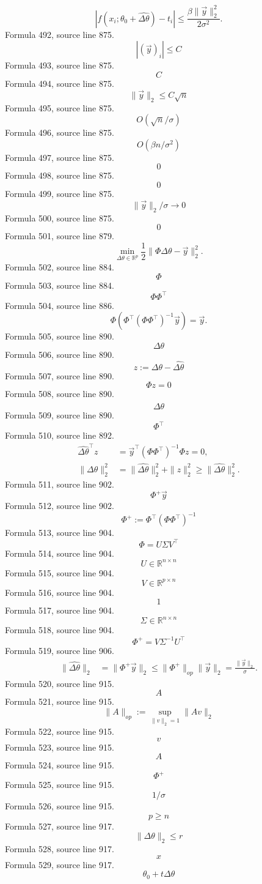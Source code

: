 \documentclass{ctexart}
\begin{document}
\[
\left|f(x_i;\theta_0+\widehat{\Delta\theta})-t_i\right|
\leq\frac{\beta\|\vec y\|_2^2}{2\sigma^2}.
\]
Formula 492, source line 875.
\[|(\vec y)_i|\leq C\]
Formula 493, source line 875.
\[C\]
Formula 494, source line 875.
\[\|\vec y\|_2\leq C\sqrt n\]
Formula 495, source line 875.
\[O(\sqrt n/\sigma)\]
Formula 496, source line 875.
\[O(\beta n/\sigma^2)\]
Formula 497, source line 875.
\[0\]
Formula 498, source line 875.
\[0\]
Formula 499, source line 875.
\[\|\vec y\|_2/\sigma\to0\]
Formula 500, source line 875.
\[0\]
Formula 501, source line 879.
\[
\min\limits_{\Delta\theta\in\mathbb R^p}
\frac12\|\Phi\Delta\theta-\vec y\|_2^2.
\]
Formula 502, source line 884.
\[\Phi\]
Formula 503, source line 884.
\[\Phi\Phi^\top\]
Formula 504, source line 886.
\[
\Phi\left(\Phi^\top(\Phi\Phi^\top)^{-1}\vec y\right)=\vec y.
\]
Formula 505, source line 890.
\[\Delta\theta\]
Formula 506, source line 890.
\[z:=\Delta\theta-\widehat{\Delta\theta}\]
Formula 507, source line 890.
\[\Phi z=0\]
Formula 508, source line 890.
\[\widehat{\Delta\theta}\]
Formula 509, source line 890.
\[\Phi^\top\]
Formula 510, source line 892.
\[
\begin{aligned}
\widehat{\Delta\theta}^{\top}z
&=\vec y^\top(\Phi\Phi^\top)^{-1}\Phi z=0,\\
\|\Delta\theta\|_2^2
&=\|\widehat{\Delta\theta}\|_2^2+\|z\|_2^2
\geq\|\widehat{\Delta\theta}\|_2^2.
\end{aligned}
\]
Formula 511, source line 902.
\[\Phi^+\vec y\]
Formula 512, source line 902.
\[\Phi^+:=\Phi^\top(\Phi\Phi^\top)^{-1}\]
Formula 513, source line 904.
\[\Phi=U\Sigma V^\top\]
Formula 514, source line 904.
\[U\in\mathbb R^{n\times n}\]
Formula 515, source line 904.
\[V\in\mathbb R^{p\times n}\]
Formula 516, source line 904.
\[1\]
Formula 517, source line 904.
\[\Sigma\in\mathbb R^{n\times n}\]
Formula 518, source line 904.
\[\Phi^+=V\Sigma^{-1}U^\top\]
Formula 519, source line 906.
\[
\begin{aligned}
\|\widehat{\Delta\theta}\|_2
&=\|\Phi^+\vec y\|_2
\leq\|\Phi^+\|_{op}\|\vec y\|_2
=\frac{\|\vec y\|_2}{\sigma}.
\end{aligned}
\]
Formula 520, source line 915.
\[A\]
Formula 521, source line 915.
\[\|A\|_{op}:=\sup_{\|v\|_2=1}\|Av\|_2\]
Formula 522, source line 915.
\[v\]
Formula 523, source line 915.
\[A\]
Formula 524, source line 915.
\[\Phi^+\]
Formula 525, source line 915.
\[1/\sigma\]
Formula 526, source line 915.
\[p\geq n\]
Formula 527, source line 917.
\[\|\Delta\theta\|_2\leq r\]
Formula 528, source line 917.
\[x\]
Formula 529, source line 917.
\[\theta_0+t\Delta\theta\]
\end{document}
